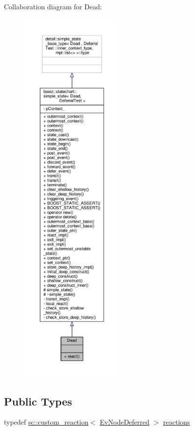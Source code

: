 Collaboration diagram for Dead\+:
\nopagebreak
\begin{figure}[H]
\begin{center}
\leavevmode
\includegraphics[height=550pt]{struct_dead__coll__graph}
\end{center}
\end{figure}
\subsection*{Public Types}
\begin{DoxyCompactItemize}
\item 
typedef \mbox{\hyperlink{classboost_1_1statechart_1_1custom__reaction}{sc\+::custom\+\_\+reaction}}$<$ \mbox{\hyperlink{struct_ev_node_deferred}{Ev\+Node\+Deferred}} $>$ \mbox{\hyperlink{struct_dead_aa0af9b4a2573a0ac901441ee8f19668a}{reactions}}
\end{DoxyCompactItemize}
